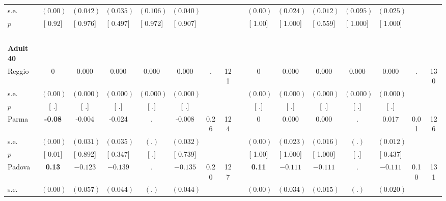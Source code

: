 \begin{longtable}{L{8em} c c c c c c c p{1em} c c c c c c c}
\quad \quad \quad \quad s.e.& $ (     0.00)$ & $ (    0.042)$ & $ (    0.035)$ & $ (    0.106)$ & $ (    0.040)$ & & & & $ (     0.00)$ & $ (    0.024)$ & $ (    0.012)$ & $ (    0.095)$ & $ (    0.025)$ & &  \\*
\quad \quad \quad \quad $ p$ & [     0.92] & [    0.976] & [    0.497] & [    0.972] & [    0.907] & & & & [     1.00] & [    1.000] & [    0.559] & [    1.000] & [    1.000] & &  \\[1em]
~\\[1em]
\quad \quad \textbf{Adult 40} & & & & & & & & & & & & & & & \\* 
\quad \quad \quad Reggio& 0 &     0.000 &     0.000 &     0.000 &     0.000 &         . &       121 & & 0 &     0.000 &     0.000 &     0.000 &     0.000 &         . &       130  \\*
\quad \quad \quad \quad s.e.& $ (     0.00)$ & $ (    0.000)$ & $ (    0.000)$ & $ (    0.000)$ & $ (    0.000)$ & & & & $ (     0.00)$ & $ (    0.000)$ & $ (    0.000)$ & $ (    0.000)$ & $ (    0.000)$ & &  \\*
\quad \quad \quad \quad $ p$ & [        .] & [        .] & [        .] & [        .] & [        .] & & & & [        .] & [        .] & [        .] & [        .] & [        .] & &  \\[1em]
\quad \quad \quad Parma& \textbf{    -0.08} &    -0.004 &    -0.024 &         . &    -0.008 &      0.26 &       124 & & 0 &     0.000 &     0.000 &         . &     0.017 &      0.01 &       126  \\*
\quad \quad \quad \quad s.e.& $ (     0.00)$ & $ (    0.031)$ & $ (    0.035)$ & $ (        .)$ & $ (    0.032)$ & & & & $ (     0.00)$ & $ (    0.023)$ & $ (    0.016)$ & $ (        .)$ & $ (    0.012)$ & &  \\*
\quad \quad \quad \quad $ p$ & [     0.01] & [    0.892] & [    0.347] & [        .] & [    0.739] & & & & [     1.00] & [    1.000] & [    1.000] & [        .] & [    0.437] & &  \\[1em]
\quad \quad \quad Padova& \textbf{     0.13} & $ \mathbf{   -0.123}$ & $ \mathbf{   -0.139}$ &         . & $ \mathbf{   -0.135}$ &      0.20 &       127 & & \textbf{     0.11} & $ \mathbf{   -0.111}$ & $ \mathbf{   -0.111}$ &         . & $ \mathbf{   -0.111}$ &      0.10 &       131  \\*
\quad \quad \quad \quad s.e.& $ (     0.00)$ & $ (    0.057)$ & $ (    0.044)$ & $ (        .)$ & $ (    0.044)$ & & & & $ (     0.00)$ & $ (    0.034)$ & $ (    0.015)$ & $ (        .)$ & $ (    0.020)$ & &  \\*

\end{longtable}
